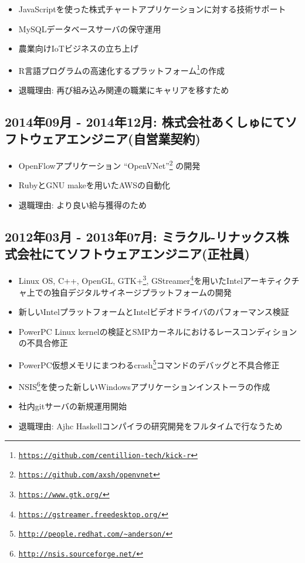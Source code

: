\documentclass[letterpaper]{article}
\begin{document}
\begin{itemize}
  \item JavaScriptを使った株式チャートアプリケーションに対する技術サポート
  \item MySQLデータベースサーバの保守運用
  \item 農業向けIoTビジネスの立ち上げ
  \item R言語プログラムの高速化するプラットフォーム\footnote{\href{https://github.com/centillion-tech/kick-r}{\tt https://github.com/centillion-tech/kick-r}}の作成
  \item 退職理由: 再び組み込み関連の職業にキャリアを移すため
\end{itemize}

\subsection*{2014年09月 - 2014年12月: 株式会社あくしゅにてソフトウェアエンジニア(自営業契約)}

\begin{itemize}
  \item OpenFlowアプリケーション ``OpenVNet''\footnote{\href{https://github.com/axsh/openvnet}{\tt https://github.com/axsh/openvnet}} の開発
  \item RubyとGNU makeを用いたAWSの自動化
  \item 退職理由: より良い給与獲得のため
\end{itemize}

\subsection*{2012年03月 - 2013年07月: ミラクル-リナックス株式会社にてソフトウェアエンジニア(正社員)}

\begin{itemize}
  \item Linux OS, C++, OpenGL, GTK+\footnote{\href{https://www.gtk.org/}{\tt https://www.gtk.org/}}, GStreamer\footnote{\href{https://gstreamer.freedesktop.org/}{\tt https://gstreamer.freedesktop.org/}}を用いたIntelアーキティクチャ上での独自デジタルサイネージプラットフォームの開発
  \item 新しいIntelプラットフォームとIntelビデオドライバのパフォーマンス検証
  \item PowerPC Linux kernelの検証とSMPカーネルにおけるレースコンディションの不具合修正
  \item PowerPC仮想メモリにまつわるcrash\footnote{\href{http://people.redhat.com/{\textasciitilde}anderson/}{\tt http://people.redhat.com/{\textasciitilde}anderson/}}コマンドのデバッグと不具合修正
  \item NSIS\footnote{\href{http://nsis.sourceforge.net/}{\tt http://nsis.sourceforge.net/}}を使った新しいWindowsアプリケーションインストーラの作成
  \item 社内gitサーバの新規運用開始
  \item 退職理由: Ajhc Haskellコンパイラの研究開発をフルタイムで行なうため
\end{itemize}
\end{document}
